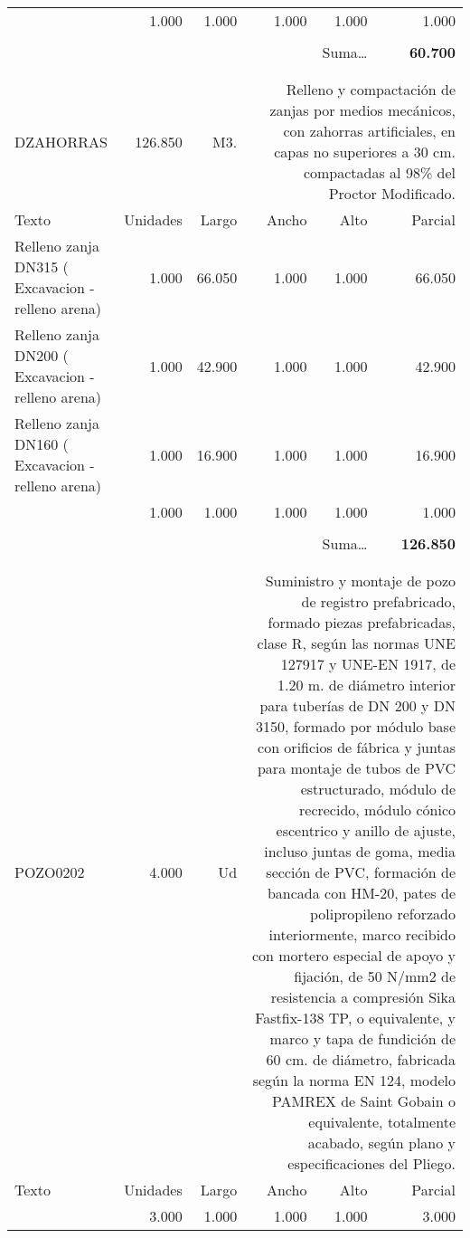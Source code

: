 \documentclass{book}%
\begin{document}
\begin{longtable}{lrrrrr}
\multicolumn{1}{p{3.5cm}}{}&1.000&1.000&1.000&1.000&1.000\\%
&&&&&\\%
\multicolumn{5}{r}{Suma\ldots}&\textbf{60.700}\\%
\hline%
&&&&&\\%
&&&&&\\%
DZAHORRAS&126.850& M3.&\multicolumn{3}{p{6cm}}{\scriptsize Relleno y compactación de zanjas por medios mecánicos, con zahorras artificiales, en capas no superiores a 30 cm. compactadas al 98\% del Proctor Modificado.\normalsize}\\%
Texto&Unidades&Largo&Ancho&Alto&Parcial\\%
\hline%
\multicolumn{1}{p{3.5cm}}{Relleno zanja DN315 ( Excavacion {-}relleno arena)}&1.000&66.050&1.000&1.000&66.050\\%
\multicolumn{1}{p{3.5cm}}{Relleno zanja DN200 ( Excavacion {-}relleno arena)}&1.000&42.900&1.000&1.000&42.900\\%
\multicolumn{1}{p{3.5cm}}{Relleno zanja DN160 ( Excavacion {-}relleno arena)}&1.000&16.900&1.000&1.000&16.900\\%
\multicolumn{1}{p{3.5cm}}{}&1.000&1.000&1.000&1.000&1.000\\%
&&&&&\\%
\multicolumn{5}{r}{Suma\ldots}&\textbf{126.850}\\%
\hline%
&&&&&\\%
&&&&&\\%
POZO0202&4.000& Ud&\multicolumn{3}{p{6cm}}{\scriptsize Suministro y montaje de pozo de registro prefabricado, formado piezas prefabricadas, clase R, según las normas UNE 127917 y UNE-EN 1917, de 1.20 m. de diámetro interior para tuberías de DN 200 y  DN 3150, formado por módulo base con orificios de fábrica y juntas para montaje de tubos de PVC estructurado, módulo de recrecido, módulo cónico escentrico y anillo de ajuste, incluso juntas de goma, media sección de PVC, formación de bancada con HM-20, pates de polipropileno reforzado interiormente, marco recibido con mortero especial de apoyo y fijación, de 50 N/mm2 de resistencia a compresión Sika Fastfix-138 TP, o equivalente, y  marco y tapa de fundición de 60 cm. de diámetro, fabricada según la norma EN 124, modelo PAMREX de Saint Gobain o equivalente, totalmente acabado, según plano y especificaciones del Pliego.\normalsize}\\%
Texto&Unidades&Largo&Ancho&Alto&Parcial\\%
\hline%
\multicolumn{1}{p{3.5cm}}{}&3.000&1.000&1.000&1.000&3.000\\%

\end{longtable}
\end{document}
